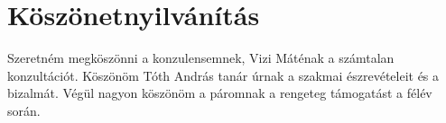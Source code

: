 \cleardoublepage{}
\chapter*{Köszönetnyilvánítás}

Szeretném megköszönni a konzulensemnek, Vizi Máténak a számtalan konzultációt. 
Köszönöm Tóth András tanár úrnak a szakmai észrevételeit és a bizalmát.  
Végül nagyon köszönöm a páromnak a rengeteg támogatást a félév során.


